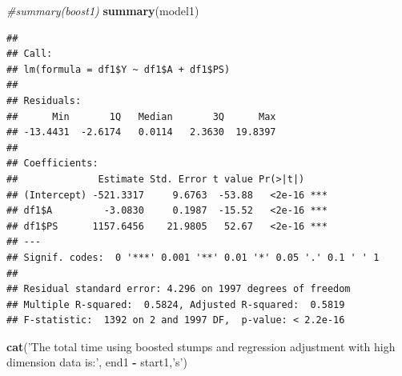 \documentclass[]{article}
\newenvironment{Shaded}{\begin{snugshade}}{\end{snugshade}}
\newcommand{\CommentTok}[1]{\textcolor[rgb]{0.56,0.35,0.01}{\textit{#1}}}
\newcommand{\DataTypeTok}[1]{\textcolor[rgb]{0.13,0.29,0.53}{#1}}
\newcommand{\DecValTok}[1]{\textcolor[rgb]{0.00,0.00,0.81}{#1}}
\newcommand{\KeywordTok}[1]{\textcolor[rgb]{0.13,0.29,0.53}{\textbf{#1}}}
\newcommand{\NormalTok}[1]{#1}
\newcommand{\OperatorTok}[1]{\textcolor[rgb]{0.81,0.36,0.00}{\textbf{#1}}}
\newcommand{\StringTok}[1]{\textcolor[rgb]{0.31,0.60,0.02}{#1}}
\begin{document}
\begin{Shaded}
\end{Shaded}

\begin{Shaded}
\begin{Highlighting}[]
\CommentTok{#summary(boost1)}
\KeywordTok{summary}\NormalTok{(model1)}
\end{Highlighting}
\end{Shaded}

\begin{verbatim}
## 
## Call:
## lm(formula = df1$Y ~ df1$A + df1$PS)
## 
## Residuals:
##      Min       1Q   Median       3Q      Max 
## -13.4431  -2.6174   0.0114   2.3630  19.8397 
## 
## Coefficients:
##              Estimate Std. Error t value Pr(>|t|)    
## (Intercept) -521.3317     9.6763  -53.88   <2e-16 ***
## df1$A         -3.0830     0.1987  -15.52   <2e-16 ***
## df1$PS      1157.6456    21.9805   52.67   <2e-16 ***
## ---
## Signif. codes:  0 '***' 0.001 '**' 0.01 '*' 0.05 '.' 0.1 ' ' 1
## 
## Residual standard error: 4.296 on 1997 degrees of freedom
## Multiple R-squared:  0.5824, Adjusted R-squared:  0.5819 
## F-statistic:  1392 on 2 and 1997 DF,  p-value: < 2.2e-16
\end{verbatim}

\begin{Shaded}
\begin{Highlighting}[]
\KeywordTok{cat}\NormalTok{(}\StringTok{'The total time using boosted stumps and regression adjustment with high dimension }
\StringTok{    data is:'}\NormalTok{, }
\NormalTok{    end1 }\OperatorTok{-}\StringTok{ }\NormalTok{start1,}\StringTok{'s'}\NormalTok{)}
\end{Highlighting}
\end{Shaded}
\end{document}
